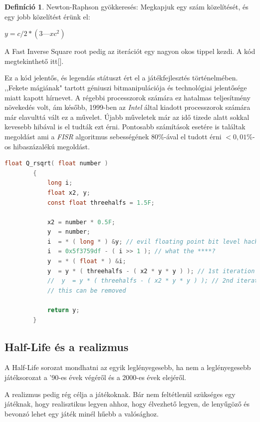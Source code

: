 \documentclass[]{thesis-ekf}
\theoremstyle{definition}
\newtheorem{definicio}{Definíció}[chapter]
\begin{document}
	\begin{definicio}
		\label{def-NRI}
		Newton-Raphson gyökkeresés:
		Megkapjuk egy szám közelítését, és egy jobb közelítést érünk el:
		
		\begin{math}
			y = c/2 * (3 — xc^2) 
		\end{math}
	\end{definicio}

	A Fast Inverse Square root pedig az iterációt egy nagyon okos tippel kezdi.
	A kód megtekinthető itt[\pageref{kod-FISR}].
	
	Ez a kód jelentős, és legendás státuszt ért el a játékfejlesztés történelmében. ,,Fekete mágiának" tartott géniuszi bitmanipulációja és technológiai jelentősége miatt kapott hírnevet. A régebbi processzorok számára ez hatalmas teljesítmény növekedés volt, ám később, 1999-ben az \emph{Intel} által kiadott processzorok számára már elavulttá vált ez a művelet. Újabb műveletek már az idő tizede alatt sokkal kevesebb hibával is el tudták ezt érni. Pontosabb számítások esetére is találtak megoldást ami a \emph{FISR} algoritmus sebességének 80\%-ával el tudott érni \begin{math}<0,01\%\end{math}-os hibaszázalékú megoldást.
	
	\begin{lstlisting}[language=C, caption={Fast Inverse Square root algoritmus, cenzúrázva}, label=kod-FISR, float, floatplacement=hbt, captionpos=b]
		float Q_rsqrt( float number )
		{
			long i;
			float x2, y;
			const float threehalfs = 1.5F;
			
			x2 = number * 0.5F;
			y  = number;
			i  = * ( long * ) &y; // evil floating point bit level hacking
			i  = 0x5f3759df - ( i >> 1 ); // what the ****? 
			y  = * ( float * ) &i;
			y  = y * ( threehalfs - ( x2 * y * y ) ); // 1st iteration
			//  y  = y * ( threehalfs - ( x2 * y * y ) ); // 2nd iteration,
			// this can be removed
			
			return y;
		}
	\end{lstlisting}
	\pagebreak

	\subsection{Half-Life és a realizmus}
	A Half-Life sorozat mondhatni az egyik leglényegesebb, ha nem a leglényegesebb játéksorozat a '90-es évek végéről és a 2000-es évek elejéről.
	
	A realizmus pedig rég célja a játékoknak. Bár nem feltétlenül szükséges egy játéknak, hogy realisztikus legyen ahhoz, hogy élvezhető legyen, de lenyűgöző és bevonzó lehet egy játék minél hűebb a valósághoz.
	
\end{document}
